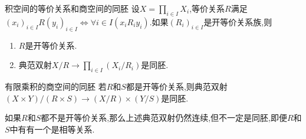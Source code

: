 \begin{corollary}{积空间的等价关系和商空间的同胚}{}
	设$X=\prod\limits_{i\in I}X_{i}$,等价关系$R$满足$\left(x_{i}\right)_{i\in I}R\left(y_{i}\right)_{i\in I}\iff\forall i\in I\left(x_{i}R_{i}y_{i}\right)$.如果$\left(R_{i}\right)_{i\in I}$是开等价关系族,则
	\begin{enumerate}
		\item $R$是开等价关系.
		\item 典范双射$X/R\to\prod\limits_{i\in I}\left(X_{i}/R_{i}\right)$是同胚.
	\end{enumerate}
\end{corollary}

\begin{corollary}{有限乘积的商空间的同胚}{}
	若$R$和$S$都是开等价关系,则典范双射$\left(X\times Y\right)/\left(R\times S\right)\to\left(X/R\right)\times\left(Y/S\right)$是同胚.
\end{corollary}

\begin{remark}{}{}
	如果$R$和$S$都不是开等价关系,那么上述典范双射仍然连续,但不一定是同胚,即便$R$和$S$中有有一个是相等关系.
\end{remark}








